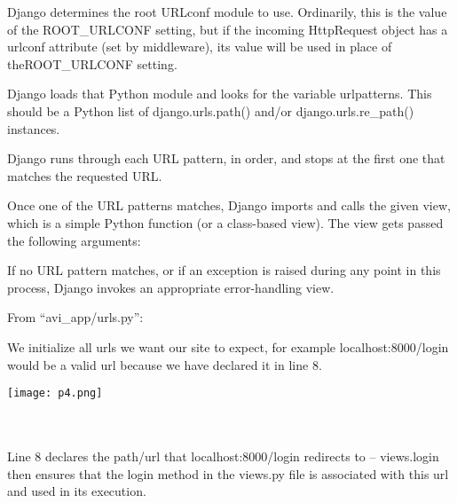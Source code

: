\documentclass[10pt]{article}
\begin{document}
\begin{description}[font=$\bullet$~\normalfont\scshape\color{red!50!black}]

\item [] Django determines the root URLconf module to use. Ordinarily, this is the value of the ROOT\_URLCONF setting, but if the incoming HttpRequest object has a urlconf attribute (set by middleware), its value will be used in place of theROOT\_URLCONF setting.

\item [] Django loads that Python module and looks for the variable urlpatterns. This should be a Python list of django.urls.path() and/or django.urls.re\_path() instances.

\item [] Django runs through each URL pattern, in order, and stops at the first one that matches the requested URL.

\item [] Once one of the URL patterns matches, Django imports and calls the given view, which is a simple Python function (or a class-based view). The view gets passed the following arguments:

 
 

\item [] If no URL pattern matches, or if an exception is raised during any point in this process, Django invokes an appropriate error-handling view.
\end{description}

From “avi\_app/urls.py”:

We initialize all urls we want our site to expect, for example localhost:8000/login would be a valid url because we have declared it in line 8.

\begin{center}
\texttt{[image: p4.png]}
\end{center} \\ \\

Line 8 declares the path/url that localhost:8000/login redirects to – views.login then ensures that the login method in the views.py file is associated with this url and used in its execution. \\
\end{document}
